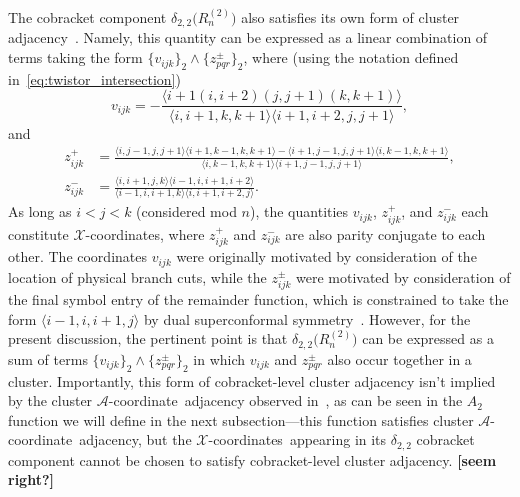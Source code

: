 \documentclass[11pt]{article}
\def\ket#1{\langle #1 \rangle}
\def\xcoords{$\mathcal{X}$-coordinates}
\def\acoord{$\mathcal{A}$-coordinate}
\def\acoords{$\mathcal{A}$-coordinates}
\def\draftnote#1{{\bf [#1]}}
\begin{document}

The cobracket component $\delta_{2,2}\big(R^{(2)}_n\big)$ also satisfies its own form of cluster adjacency~\cite{Golden:2014pua}. Namely, this quantity can be expressed as a linear combination of terms taking the form $\{ v_{ijk} \}_2 \wedge \{ z^{\pm}_{pqr} \}_2$, where (using the notation defined in~\eqref{eq:twistor_intersection})
\begin{equation}
v_{ijk} = - \frac{\ket{i+1 (i,i+2) (j,j+1)(k,k+1)}}{\ket{i,i+1,k,k+1}\ket{i+1,i+2,j,j+1}},
\end{equation}
and
\begin{align}
z_{ijk}^+ &= \frac{\ket{i,j-1,j,j+1}\ket{i+1,k-1,k,k+1}-\ket{i+1,j-1,j,j+1}\ket{i,k-1,k,k+1}}{\ket{i,k-1,k,k+1}\ket{i+1,j-1,j,j+1}}, \nonumber \\
z_{ijk}^- &= \frac{\ket{i,i+1,j,k}\ket{i-1,i,i+1,i+2}}{\ket{i-1,i,i+1,k}\ket{i,i+1,i+2,j}}.
\end{align}
As long as $i<j<k$ (considered mod $n$), the quantities $v_{ijk}$, $z_{ijk}^+$, and $z_{ijk}^-$ each constitute \xcoords, where $z_{ijk}^+$ and $z_{ijk}^-$ are also parity conjugate to each other. The coordinates $v_{ijk}$ were originally motivated by consideration of the location of physical branch cuts, while the $z_{ijk}^\pm$ were motivated by consideration of the final symbol entry of the remainder function, which is constrained to take the form $\ket{i-1,i,i+1,j}$ by dual superconformal symmetry~\cite{CaronHuot:2011kk}. However, for the present discussion, the pertinent point is that $\delta_{2,2}\big(R^{(2)}_n\big)$ can be expressed as a sum of terms $\{ v_{ijk} \}_2 \wedge \{ z^{\pm}_{pqr} \}_2$ in which $v_{ijk}$ and $z^{\pm}_{pqr}$ also occur together in a cluster. Importantly, this form of cobracket-level cluster adjacency isn't implied by the cluster \acoord\ adjacency observed in~\cite{Drummond:2017ssj}, as can be seen in the $A_2$ function we will define in the next subsection---this function satisfies cluster \acoord\ adjacency, but the \xcoords\ appearing in its $\delta_{2,2}$ cobracket component cannot be chosen to satisfy cobracket-level cluster adjacency.  \draftnote{seem right?}
\end{document}
